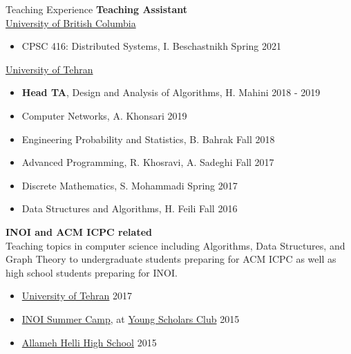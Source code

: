 \documentclass{resume} %
\begin{document}

\begin{rSection}{Teaching Experience}
	{\bf Teaching Assistant}
	\\\href{https://www.ubc.ca/}{University of British Columbia}
	\begin{itemize}
		\item CPSC 416: Distributed Systems, I. Beschastnikh \hfill Spring 2021
	\end{itemize}
	
	\href{http://ut.ac.ir/en}{University of Tehran}
	\begin{itemize}
		\item {\bf Head TA}, Design and Analysis of Algorithms, H. Mahini \hfill 2018 - 2019 
		\item Computer Networks, A. Khonsari \hfill 2019 
		\item Engineering Probability and Statistics, B. Bahrak \hfill Fall 2018
		\item Advanced Programming, R. Khosravi, A. Sadeghi \hfill Fall 2017
		\item Discrete Mathematics, S. Mohammadi \hfill Spring 2017
		\item Data Structures and Algorithms, H. Feili \hfill Fall 2016
	\end{itemize}
	
	{\bf INOI and ACM ICPC related}
	\\Teaching topics in computer science including Algorithms, Data Structures,
	and Graph Theory to undergraduate students preparing for ACM ICPC as well as high school
	students preparing for INOI.
	\begin{itemize}
		\item \href{http://ut.ac.ir/en}{University of Tehran} \hfill 2017
		\item \href{http://inoi.ir/}{INOI Summer Camp}, at \href{http://ysc.ac.ir/}{Young Scholars Club} \hfill 2015
		\item \href{http://www.helli.ir/}{Allameh Helli High School} \hfill 2015
	\end{itemize}
\end{rSection}
\end{document}
